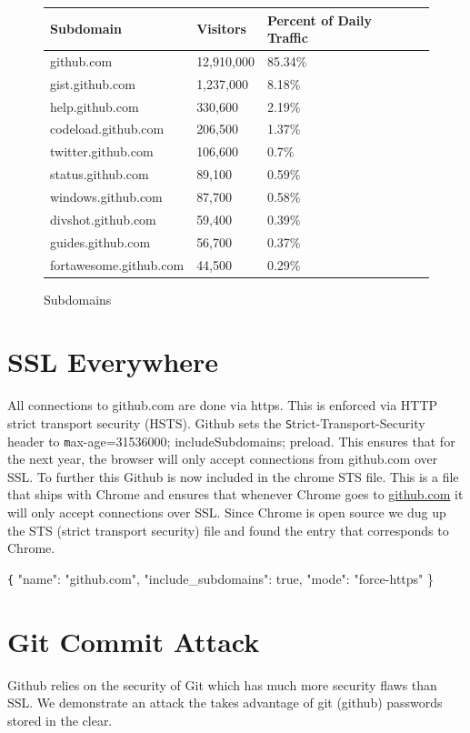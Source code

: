 \documentclass[12pt]{article}
\renewcommand{\tt}[1]{\texttt{#1}}
\begin{document}
\begin{figure}
\begin{table}
\begin{tabular}{| l | l | l | l | l | }
\hline

Subdomain & Visitors & Percent of Daily Traffic \\ \hline
github.com & 12,910,000 & 85.34\% \\ \hline
gist.github.com & 1,237,000 & 8.18\%  \\ \hline
help.github.com & 330,600 & 2.19\%  \\ \hline
codeload.github.com & 206,500 & 1.37\%  \\ \hline
twitter.github.com & 106,600 & 0.7\%  \\ \hline
status.github.com & 89,100 & 0.59\%  \\ \hline
windows.github.com & 87,700 & 0.58\%  \\ \hline
divshot.github.com & 59,400 & 0.39\%  \\ \hline
guides.github.com & 56,700 & 0.37\%  \\ \hline
fortawesome.github.com & 44,500 & 0.29\%  \\ \hline
\end{tabular}
\end{table}
\caption{Subdomains\newline}
\label{fig:mig_over}
\end{figure}


\section{SSL Everywhere}

All connections to github.com are done via https. This is enforced via HTTP strict transport security (HSTS). Github sets the {\tt Strict-Transport-Security} header to {\tt max-age=31536000; includeSubdomains; preload}. This ensures that for the next year, the browser will only accept connections from github.com over SSL. To further this Github is now included in the chrome STS file. This is a file that ships with Chrome and ensures that whenever Chrome goes to \url{github.com} it will only accept connections over SSL. Since Chrome is open source we dug up the STS (strict transport security) file and found the entry that corresponds to Chrome.

{\tt \{ "name": "github.com", "include\_subdomains": true, "mode": "force-https" \}}


\section{Git Commit Attack}
Github relies on the security of Git which has much more security flaws than SSL. We demonstrate an attack the takes advantage of git (github) passwords stored in the clear.
\end{document}
